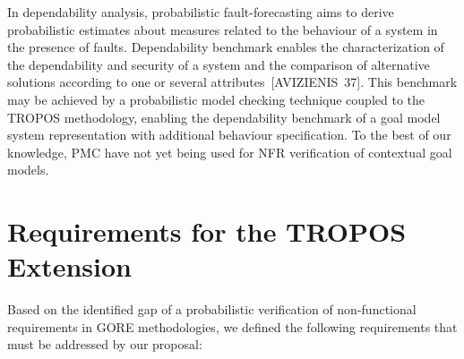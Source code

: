 In dependability analysis, probabilistic fault-forecasting aims to derive probabilistic estimates about measures related to the behaviour of a system in the presence of faults. Dependability benchmark enables the characterization of the dependability and security of a system and the comparison of alternative solutions according to one or several attributes~[AVIZIENIS~37]. This benchmark may be achieved by a probabilistic model checking technique coupled to the TROPOS methodology, enabling the dependability benchmark of a goal model system representation with additional behaviour specification. To the best of our knowledge, PMC have not yet being used for NFR verification of contextual goal models.


\section{Requirements for the TROPOS Extension}

Based on the identified gap of a probabilistic verification of non-functional requirements in GORE methodologies, we defined the following requirements that must be addressed by our proposal:

